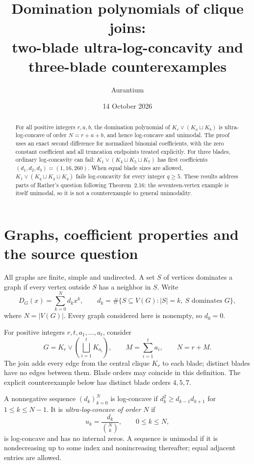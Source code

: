 \documentclass[11pt,a4paper]{article}
\title{Domination polynomials of clique joins:\protect\\two-blade ultra-log-concavity and three-blade counterexamples}
\author{Aurantium}
\date{14 October 2026}
\newcommand{\sqcupdot}{\bigsqcup}
\begin{document}
\maketitle
\begin{abstract}
For all positive integers $r,a,b$, the domination polynomial of
$K_r\vee(K_a\sqcup K_b)$ is ultra-log-concave of order $N=r+a+b$,
and hence log-concave and unimodal. The proof uses an exact second
difference for normalized binomial coefficients, with the zero
constant coefficient and all truncation endpoints treated explicitly.
For three blades, ordinary log-concavity can fail:
$K_1\vee(K_4\sqcup K_5\sqcup K_7)$ has first coefficients
$(d_1,d_2,d_3)=(1,16,260)$. When equal blade sizes are allowed,
$K_1\vee(K_q\sqcup K_q\sqcup K_q)$ fails log-concavity for every
integer $q\ge5$. These results address parts of Rather's question
following Theorem~2.16; the seventeen-vertex example is itself
unimodal, so it is not a counterexample to general unimodality.
\end{abstract}

\section{Graphs, coefficient properties and the source question}
All graphs are finite, simple and undirected. A set $S$ of vertices
dominates a graph if every vertex outside $S$ has a neighbor in $S$.
Write
\[
 D_G(x)=\sum_{k=0}^{N}d_kx^k,
 \qquad d_k=\#\{S\subseteq V(G):|S|=k,\ S\text{ dominates }G\},
\]
where $N=|V(G)|$. Every graph considered here is nonempty, so $d_0=0$.

For positive integers $r,t,a_1,\ldots,a_t$, consider
\begin{equation}\label{eq:graph}
 G=K_r\vee\left(\sqcupdot_{i=1}^{t}K_{a_i}\right),
 \qquad M=\sum_{i=1}^{t}a_i,\qquad N=r+M.
\end{equation}
The join adds every edge from the central clique $K_r$ to each
blade; distinct blades have no edges between them. Blade orders may
coincide in this definition. The explicit counterexample below has
distinct blade orders $4,5,7$.

A nonnegative sequence $(d_k)_{k=0}^{N}$ is log-concave if
$d_k^2\ge d_{k-1}d_{k+1}$ for $1\le k\le N-1$. It is
\emph{ultra-log-concave of order $N$} if
\[
 u_k=\frac{d_k}{\binom Nk},\qquad 0\le k\le N,
\]
is log-concave and has no internal zeros. A sequence is unimodal if
it is nondecreasing up to some index and nonincreasing thereafter;
equal adjacent entries are allowed.
\end{document}
